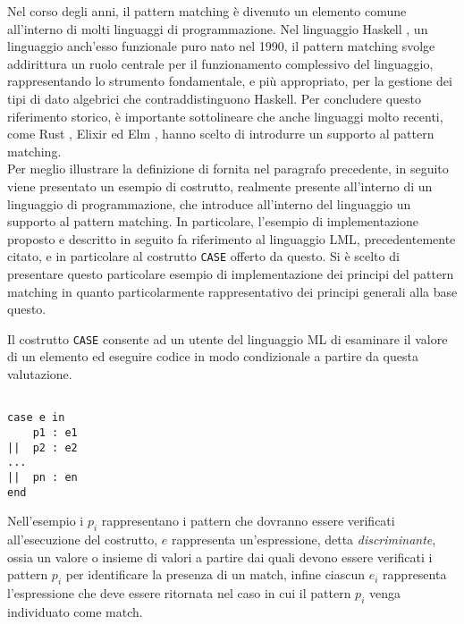 Nel corso degli anni, il pattern matching è divenuto un elemento comune
all'interno di molti linguaggi di programmazione. Nel linguaggio Haskell
\cite{DBLP:conf/hopl/HudakHJW07}, un linguaggio anch'esso funzionale puro nato
nel 1990, il pattern matching svolge addirittura un ruolo centrale per il
funzionamento complessivo del linguaggio, rappresentando lo strumento
fondamentale, e più appropriato, per la gestione dei tipi di dato algebrici che
contraddistinguono Haskell. Per concludere questo riferimento storico, è
importante sottolineare che anche linguaggi molto recenti, come Rust
\cite{rust2016}, Elixir \cite{laurent2014introducing} ed Elm \cite{elm2016},
hanno scelto di introdurre un supporto al pattern matching.\\

Per meglio illustrare la definizione di fornita nel paragrafo precedente, in
seguito viene presentato un esempio di costrutto, realmente presente all'interno
di un linguaggio di programmazione, che introduce all'interno del linguaggio un
supporto al pattern matching. In particolare, l'esempio di implementazione
proposto e descritto in seguito fa riferimento al linguaggio LML,
precedentemente citato, e in particolare al costrutto \texttt{CASE} offerto da
questo. Si è scelto di presentare questo particolare esempio di implementazione
dei principi del pattern matching in quanto particolarmente rappresentativo dei
principi generali alla base questo.

Il costrutto \texttt{CASE} consente ad un utente del linguaggio ML di esaminare
il valore di un elemento ed eseguire codice in modo condizionale a partire da
questa valutazione.

\begin{lstlisting}[caption=Il costrutto \texttt{CASE} presente in LML
rappresenta un esempio di supporto al pattern matching.]

case e in
    p1 : e1
||  p2 : e2
...
||  pn : en
end

\end{lstlisting}

Nell'esempio i $p_i$ rappresentano i pattern che dovranno essere verificati
all’esecuzione del costrutto, $e$ rappresenta un’espressione, detta
\textit{discriminante}, ossia un valore o insieme di valori a partire dai quali
devono essere verificati i pattern $p_i$ per identificare la presenza di un
match, infine ciascun $e_i$ rappresenta l'espressione che deve essere ritornata
nel caso in cui il pattern $p_i$ venga individuato come match.


